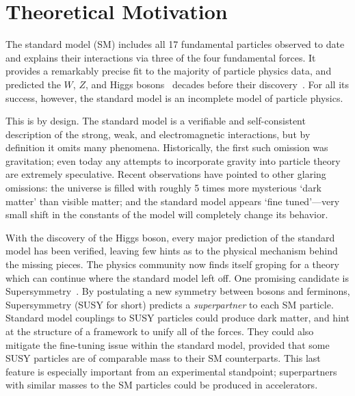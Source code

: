 \chapter{Theoretical Motivation}

The standard model (SM) includes all 17 fundamental particles observed to date and explains their interactions via three of the four fundamental forces.
It provides a remarkably precise fit to the majority of particle physics data, and predicted the $W$, $Z$, and Higgs bosons~\cite{wzmass1,higgs1,higgs2} decades before their discovery~\cite{ua1w,ua2w,ua1z,ua2z,atlashiggs,cmshiggs}.
For all its success, however, the standard model is an incomplete model of particle physics.

This is by design. The standard model is a verifiable and self-consistent description of the strong, weak, and electromagnetic interactions, but by definition it omits many phenomena.
Historically, the first such omission was gravitation; even today any attempts to incorporate gravity into particle theory are extremely speculative.
Recent observations have pointed to other glaring omissions:
the universe is filled with roughly 5 times more mysterious `dark matter' than visible matter; and
the standard model appears `fine tuned'---very small shift in the constants of the model will completely change its behavior.

With the discovery of the Higgs boson, every major prediction of the standard model has been verified, leaving few hints as to the physical mechanism behind the missing pieces.
The physics community now finds itself groping for a theory %
which can continue where the standard model left off. One promising candidate is Supersymmetry~\cite{susyprimer,srednicki,pdg2014}.
By postulating a new symmetry between bosons and ferminons, Supersymmetry (SUSY for short) predicts a \emph{superpartner} to each SM particle. Standard model couplings to SUSY particles could produce dark matter,
and hint at the structure of a framework to unify all of the forces.
They could also mitigate the fine-tuning issue within the standard model, provided that some SUSY particles are of comparable mass to their SM counterparts. This last feature is especially important from an experimental standpoint; superpartners with similar masses to the SM particles could be produced in accelerators.

